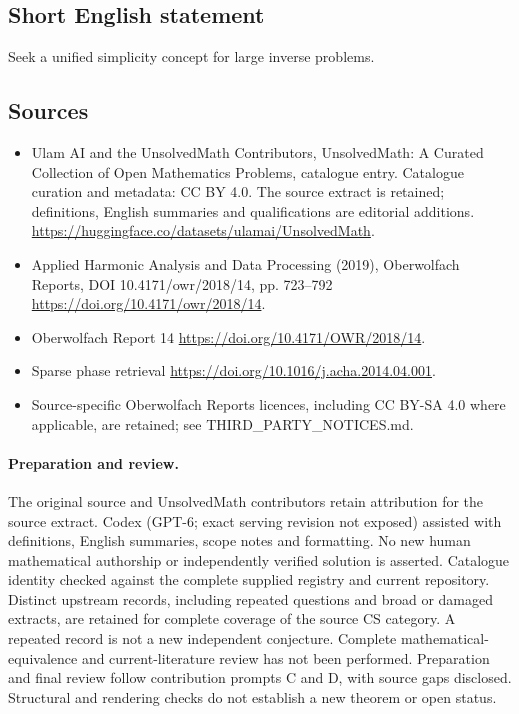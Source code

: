 \documentclass[11pt]{article}
\begin{document}
\subsection{Short English statement}
Seek a unified simplicity concept for large inverse problems.
\subsection{Sources}
\begin{itemize}
\item[\hypertarget{source:statement:1}{S1}] Ulam AI and the UnsolvedMath Contributors, UnsolvedMath: A Curated Collection of Open Mathematics Problems, catalogue entry. Catalogue curation and metadata: CC BY 4.0. The source extract is retained; definitions, English summaries and qualifications are editorial additions.
\url{https://huggingface.co/datasets/ulamai/UnsolvedMath}.
\item[\hypertarget{source:statement:2}{S2}] Applied Harmonic Analysis and Data Processing (2019), Oberwolfach Reports, DOI 10.4171/owr/2018/14, pp. 723--792
\url{https://doi.org/10.4171/owr/2018/14}.
\item[\hypertarget{source:statement:3}{S3}] Oberwolfach Report 14
\url{https://doi.org/10.4171/OWR/2018/14}.
\item[\hypertarget{source:statement:4}{S4}] Sparse phase retrieval
\url{https://doi.org/10.1016/j.acha.2014.04.001}.
\item Source-specific Oberwolfach Reports licences, including CC BY-SA 4.0 where applicable, are retained; see THIRD\_PARTY\_NOTICES.md.
\end{itemize}
\paragraph{Preparation and review.}
The original source and UnsolvedMath contributors retain attribution for the source extract. Codex (GPT-6; exact serving revision not exposed) assisted with definitions, English summaries, scope notes and formatting. No new human mathematical authorship or independently verified solution is asserted. Catalogue identity checked against the complete supplied registry and current repository. Distinct upstream records, including repeated questions and broad or damaged extracts, are retained for complete coverage of the source CS category. A repeated record is not a new independent conjecture. Complete mathematical-equivalence and current-literature review has not been performed. Preparation and final review follow contribution prompts C and D, with source gaps disclosed. Structural and rendering checks do not establish a new theorem or open status.
\label{end:statement}
\end{document}

